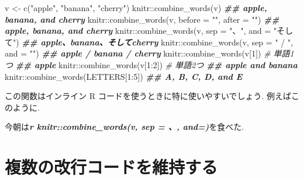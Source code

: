 \documentclass[
  11pt,
  lualatex,
  ja=standard]{bxjsreport}
\newenvironment{Shaded}{\begin{snugshade}}{\end{snugshade}}
\newcommand{\AttributeTok}[1]{\textcolor[rgb]{0.77,0.63,0.00}{#1}}
\newcommand{\CommentTok}[1]{\textcolor[rgb]{0.56,0.35,0.01}{\textit{#1}}}
\newcommand{\DecValTok}[1]{\textcolor[rgb]{0.00,0.00,0.81}{#1}}
\newcommand{\DocumentationTok}[1]{\textcolor[rgb]{0.56,0.35,0.01}{\textbf{\textit{#1}}}}
\newcommand{\FunctionTok}[1]{\textcolor[rgb]{0.00,0.00,0.00}{#1}}
\newcommand{\InformationTok}[1]{\textcolor[rgb]{0.56,0.35,0.01}{\textbf{\textit{#1}}}}
\newcommand{\NormalTok}[1]{#1}
\newcommand{\OtherTok}[1]{\textcolor[rgb]{0.56,0.35,0.01}{#1}}
\newcommand{\SpecialCharTok}[1]{\textcolor[rgb]{0.00,0.00,0.00}{#1}}
\newcommand{\StringTok}[1]{\textcolor[rgb]{0.31,0.60,0.02}{#1}}
\begin{document}
\begin{Shaded}
\begin{Highlighting}[numbers=left,,]
\NormalTok{v }\OtherTok{\textless{}{-}} \FunctionTok{c}\NormalTok{(}\StringTok{"apple"}\NormalTok{, }\StringTok{"banana"}\NormalTok{, }\StringTok{"cherry"}\NormalTok{)}
\NormalTok{knitr}\SpecialCharTok{::}\FunctionTok{combine\_words}\NormalTok{(v)}
\DocumentationTok{\#\# apple, banana, and cherry}
\NormalTok{knitr}\SpecialCharTok{::}\FunctionTok{combine\_words}\NormalTok{(v, }\AttributeTok{before =} \StringTok{"\textasciigrave{}"}\NormalTok{, }\AttributeTok{after =} \StringTok{"\textquotesingle{}"}\NormalTok{)}
\DocumentationTok{\#\# \textasciigrave{}apple\textquotesingle{}, \textasciigrave{}banana\textquotesingle{}, and \textasciigrave{}cherry\textquotesingle{}}
\NormalTok{knitr}\SpecialCharTok{::}\FunctionTok{combine\_words}\NormalTok{(v, }\AttributeTok{sep =} \StringTok{"、"}\NormalTok{, }\AttributeTok{and =} \StringTok{"そして"}\NormalTok{)}
\DocumentationTok{\#\# apple、banana、そしてcherry}
\NormalTok{knitr}\SpecialCharTok{::}\FunctionTok{combine\_words}\NormalTok{(v, }\AttributeTok{sep =} \StringTok{" / "}\NormalTok{, }\AttributeTok{and =} \StringTok{""}\NormalTok{)}
\DocumentationTok{\#\# apple / banana / cherry}
\NormalTok{knitr}\SpecialCharTok{::}\FunctionTok{combine\_words}\NormalTok{(v[}\DecValTok{1}\NormalTok{])  }\CommentTok{\# 単語1つ}
\DocumentationTok{\#\# apple}
\NormalTok{knitr}\SpecialCharTok{::}\FunctionTok{combine\_words}\NormalTok{(v[}\DecValTok{1}\SpecialCharTok{:}\DecValTok{2}\NormalTok{])  }\CommentTok{\# 単語2つ}
\DocumentationTok{\#\# apple and banana}
\NormalTok{knitr}\SpecialCharTok{::}\FunctionTok{combine\_words}\NormalTok{(LETTERS[}\DecValTok{1}\SpecialCharTok{:}\DecValTok{5}\NormalTok{])}
\DocumentationTok{\#\# A, B, C, D, and E}
\end{Highlighting}
\end{Shaded}

この関数はインライン R コードを使うときに特に使いやすいでしょう. 例えばこのように.

\begin{Shaded}
\begin{Highlighting}[]
\NormalTok{今朝は}\InformationTok{\textasciigrave{}r knitr::combine\_words(v, sep = \textquotesingle{}、\textquotesingle{}, and=\textquotesingle{}\textquotesingle{})\textasciigrave{}}\NormalTok{を食べた.}
\end{Highlighting}
\end{Shaded}

\hypertarget{linebreaks}{%
\section{複数の改行コードを維持する}\label{linebreaks}}
\end{document}
